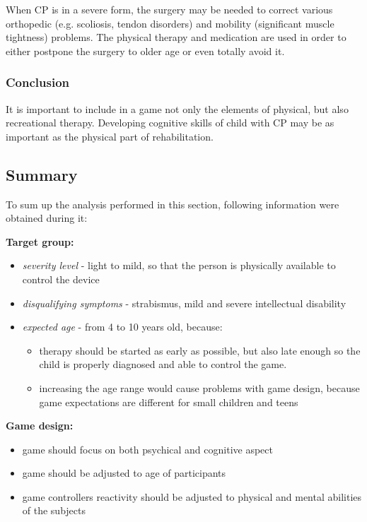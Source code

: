 When CP is in a severe form, the surgery may be needed to correct various orthopedic (e.g. scoliosis, tendon disorders) and mobility (significant muscle tightness) problems. The physical therapy and medication are used in order to either postpone the surgery to older age or even totally avoid it.

\subsubsection*{Conclusion}
It is important to include in a game not only the elements of physical, but also recreational therapy. Developing cognitive skills of child with CP may be as important as the physical part of rehabilitation.

\subsection{Summary}
To sum up the analysis performed in this section, following information were obtained during it:

\textbf{Target group:}
\begin{itemize}
\item \emph{severity level} - light to mild, so that the person is physically available to control the device
\item \emph{disqualifying symptoms} - strabismus, mild and severe intellectual disability
\item \emph{expected age} - from 4 to 10 years old, because:
\begin{itemize}
\item therapy should be started as early as possible, but also late enough so the child is properly diagnosed and able to control the game. 
\item increasing the age range would cause problems with game design, because game expectations are different for small children and teens
\end{itemize}
\end{itemize}

\textbf{Game design:}
\begin{itemize}
\item game should focus on both psychical and cognitive aspect
\item game should be adjusted to age of participants
\item game controllers reactivity should be adjusted to physical and mental abilities of the subjects
\end{itemize}

